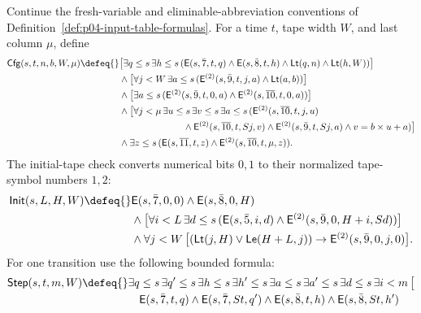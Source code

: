 \begin{definition}
\label{def:p04-computation-formula}
Continue the fresh-variable and eliminable-abbreviation conventions of
Definition~\ref{def:p04-input-table-formulas}.  For a time \(t\), tape
width \(W\), and last column \(\mu\), define
\[
\begin{aligned}
 \mathsf{Cfg}(s,t,n,b,W,\mu)\defeq{}&
 \bigl[\exists q\leq s\,\exists h\leq s\,
  (\mathsf E(s,\bar7,t,q)\land\mathsf E(s,\bar8,t,h)
       \land\mathsf{Lt}(q,n)\land\mathsf{Lt}(h,W))\bigr]\\
 &\land\bigl[\forall j<W\,\exists a\leq s\,
    (\mathsf E^{(2)}(s,\bar9,t,j,a)\land\mathsf{Lt}(a,b))\bigr]\\
 &\land\bigl[\exists a\leq s\,
    (\mathsf E^{(2)}(s,\bar9,t,0,a)
       \land\mathsf E^{(2)}(s,\overline{10},t,0,a))\bigr]\\
 &\land\bigl[\forall j<\mu\,\exists u\leq s\,\exists v\leq s\,
       \exists a\leq s\,(
       \mathsf E^{(2)}(s,\overline{10},t,j,u)\\
 &\hspace{24mm}\land\mathsf E^{(2)}(s,\overline{10},t,Sj,v)
       \land\mathsf E^{(2)}(s,\bar9,t,Sj,a)
       \land v=b\times u+a)\bigr]\\
 &\land\exists z\leq s\,
   (\mathsf E(s,\overline{11},t,z)
       \land\mathsf E^{(2)}(s,\overline{10},t,\mu,z)).
\end{aligned}
\]
The initial-tape check converts numerical bits \(0,1\) to their
normalized tape-symbol numbers \(1,2\):
\[
\begin{aligned}
 \mathsf{Init}(s,L,H,W)\defeq{}&
   \mathsf E(s,\bar7,0,0)\land\mathsf E(s,\bar8,0,H)\\
 &\land\bigl[\forall i<L\,\exists d\leq s\,
   (\mathsf E(s,\bar5,i,d)
       \land\mathsf E^{(2)}(s,\bar9,0,H+i,Sd))\bigr]\\
 &\land\forall j<W\,
   \bigl[(\mathsf{Lt}(j,H)\lor\mathsf{Le}(H+L,j))
           \to\mathsf E^{(2)}(s,\bar9,0,j,0)\bigr].
\end{aligned}
\]
For one transition use the following bounded formula:
\[
\begin{aligned}
 \mathsf{Step}(s,t,m,W)\defeq{}&
  \exists q\leq s\,\exists q'\leq s\,
  \exists h\leq s\,\exists h'\leq s\,
  \exists a\leq s\,\exists a'\leq s\,
  \exists d\leq s\,\exists i<m\,\bigl[\\
 &\quad\mathsf E(s,\bar7,t,q)\land\mathsf E(s,\bar7,St,q')
       \land\mathsf E(s,\bar8,t,h)\land\mathsf E(s,\bar8,St,h')\\

\end{aligned}\]
\end{definition}
